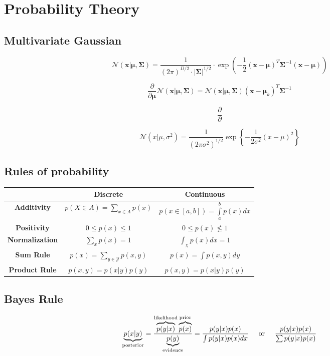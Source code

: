 \section{Probability Theory}
\subsection{Multivariate Gaussian}
$$\mathcal{N}\left(\bm{x}|\bm{\mu}, \bm{\Sigma}\right) = \frac{1}{\left(2\pi\right)^{D/2} \cdot |\bm{\Sigma}|^{1/2}}\cdot \exp\left(-\frac{1}{2}\left(\bm{x}-\bm{\mu}\right)^T\bm{\Sigma}^{-1}\left(\bm{x}-\bm{\mu}\right)\right)$$

$$\frac{\partial}{\partial \bm{\mu}}\mathcal{N}\left(\bm{x}|\bm{\mu}, \bm{\Sigma}\right)  = \mathcal{N}\left(\bm{x}|\bm{\mu}, \bm{\Sigma}\right) \left(\bm{x}-\bm{\mu}_k\right)^T\bm{\Sigma}^{-1}$$

$$\dfrac{\partial}{\partial }$$

$$\mathcal{N}(x|\mu,\sigma^2) = \dfrac{1}{(2\pi \sigma^2)^{1/2}} \exp \left\{ - \dfrac{1}{2\sigma^2} (x - \mu)^2 \right\}$$


\subsection{Rules of probability}
\begin{table}[ht]
	\centering
	\begin{tabular}{c|cc}
		& \textbf{Discrete} & \textbf{Continuous}\\
		\hline
		\textbf{Additivity} & $p(X\in A) = \sum\limits_{x\in A}p(x)$ & $p\left(x\in [a,b]\right) = \int\limits_{a}^{b}p(x)dx$\\[10pt]
		\textbf{Positivity} & $0 \leq p(x)\leq 1$ & $0 \leq p(x) \not\leq 1$\\[10pt]
		\textbf{Normalization} & $\sum_{x} p(x) = 1$ & $\int_{\chi} p(x)dx = 1$\\[10pt]
		\textbf{Sum Rule} & $p(x) = \sum\limits_{y\in\mathcal{Y}} p(x,y)$ & $p(x)=\int\limits p(x,y)dy$\\[10pt]
		\textbf{Product Rule} & $p(x,y) = p(x|y)p(y)$ & $p(x,y) = p(x|y)p(y)$
	\end{tabular}
\end{table}
\subsection{Bayes Rule}
$$\underbrace{p(x|y)}_{\text{posterior}} = \frac{\overbrace{p(y|x)}^{\text{likelihood}} \overbrace{p(x)}^{\text{prior}}}{\underbrace{p(y)}_{\text{evidence}}} = \frac{p(y|x) p(x)}{\int p(y|x) p(x)dx} \text{\hspace{5mm}or\hspace{5mm}} \frac{p(y|x) p(x)}{\sum p(y|x) p(x)}$$